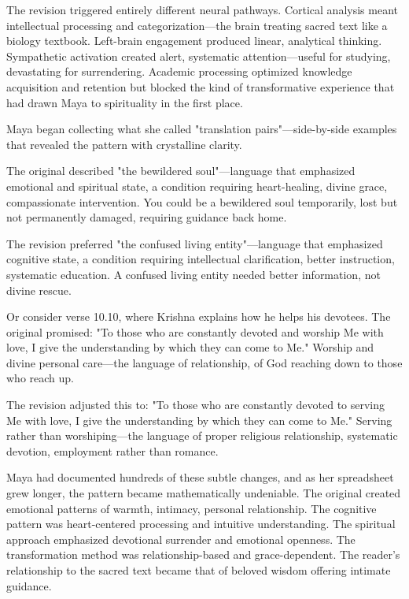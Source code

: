 \documentclass[12pt,twoside]{book}
\begin{document}
The revision triggered entirely different neural pathways. Cortical analysis meant intellectual processing and categorization—the brain treating sacred text like a biology textbook. Left-brain engagement produced linear, analytical thinking. Sympathetic activation created alert, systematic attention—useful for studying, devastating for surrendering. Academic processing optimized knowledge acquisition and retention but blocked the kind of transformative experience that had drawn Maya to spirituality in the first place.

Maya began collecting what she called "translation pairs"—side-by-side examples that revealed the pattern with crystalline clarity.

The original described "the bewildered soul"—language that emphasized emotional and spiritual state, a condition requiring heart-healing, divine grace, compassionate intervention. You could be a bewildered soul temporarily, lost but not permanently damaged, requiring guidance back home.

The revision preferred "the confused living entity"—language that emphasized cognitive state, a condition requiring intellectual clarification, better instruction, systematic education. A confused living entity needed better information, not divine rescue.

Or consider verse 10.10, where Krishna explains how he helps his devotees. The original promised: "To those who are constantly devoted and worship Me with love, I give the understanding by which they can come to Me." Worship and divine personal care—the language of relationship, of God reaching down to those who reach up.

The revision adjusted this to: "To those who are constantly devoted to serving Me with love, I give the understanding by which they can come to Me." Serving rather than worshiping—the language of proper religious relationship, systematic devotion, employment rather than romance.

Maya had documented hundreds of these subtle changes, and as her spreadsheet grew longer, the pattern became mathematically undeniable. The original created emotional patterns of warmth, intimacy, personal relationship. The cognitive pattern was heart-centered processing and intuitive understanding. The spiritual approach emphasized devotional surrender and emotional openness. The transformation method was relationship-based and grace-dependent. The reader's relationship to the sacred text became that of beloved wisdom offering intimate guidance.
\end{document}
